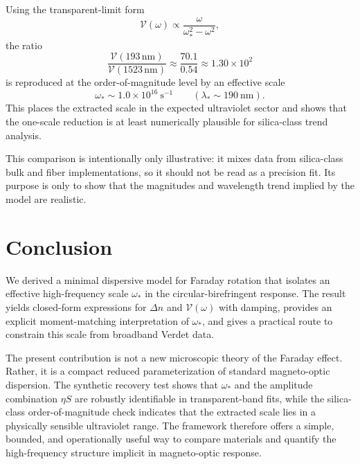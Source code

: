 \documentclass[11pt,a4paper]{article}
\begin{document}
    Using the transparent-limit form
    \begin{equation}
        \mathcal{V}(\omega)\propto
        \frac{\omega}{\omega_\ast^2-\omega^2},
    \end{equation}
    the ratio
    \[
    \frac{\mathcal{V}(193\,\mathrm{nm})}{\mathcal{V}(1523\,\mathrm{nm})}
    \approx
    \frac{70.1}{0.54}
    \approx 1.30\times 10^2
    \]
    is reproduced at the order-of-magnitude level by an effective scale
    \[
    \omega_\ast \sim 1.0\times 10^{16}\ \mathrm{s^{-1}}
    \qquad
    (\lambda_\ast \sim 190\ \mathrm{nm}).
    \]
    This places the extracted scale in the expected ultraviolet sector and shows that the one-scale reduction is at least numerically plausible for silica-class trend analysis.
    
    This comparison is intentionally only illustrative: it mixes data from silica-class bulk and fiber implementations, so it should not be read as a precision fit. Its purpose is only to show that the magnitudes and wavelength trend implied by the model are realistic.
    
    \section{Conclusion}
    
    We derived a minimal dispersive model for Faraday rotation that isolates an effective high-frequency scale $\omega_\ast$ in the circular-birefringent response. The result yields closed-form expressions for $\Delta n$ and $\mathcal{V}(\omega)$ with damping, provides an explicit moment-matching interpretation of $\omega_\ast$, and gives a practical route to constrain this scale from broadband Verdet data.
    
    The present contribution is not a new microscopic theory of the Faraday effect. Rather, it is a compact reduced parameterization of standard magneto-optic dispersion. The synthetic recovery test shows that $\omega_\ast$ and the amplitude combination $\eta S$ are robustly identifiable in transparent-band fits, while the silica-class order-of-magnitude check indicates that the extracted scale lies in a physically sensible ultraviolet range. The framework therefore offers a simple, bounded, and operationally useful way to compare materials and quantify the high-frequency structure implicit in magneto-optic response.
    
\end{document}
